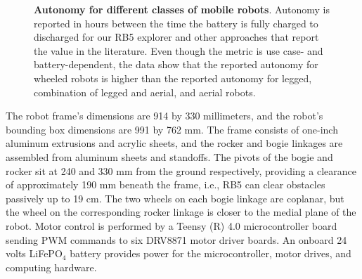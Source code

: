 \documentclass[letterpaper,10pt,conference,twoside]{IEEEtran}
\theoremstyle{definition}
\begin{document}
\begin{figure}[t]
  \vspace*{-.45cm}
  \begin{minipage}[t]{0.58\columnwidth}
    \hspace*{-.5cm}
    
  \end{minipage}\hfill
  \begin{minipage}[t]{0.41\columnwidth}
    \vspace*{-5.1cm}
    \centering
    \caption[Autonomy for different classes of mobile robots]{%
    \textbf{Autonomy for different classes of mobile robots}. 
    Autonomy is reported in hours between the time the battery is fully charged to discharged for our RB5 explorer and other approaches that report the value in the literature. Even though the metric is use case- and battery-dependent, the data show that the reported autonomy for wheeled robots is higher than the reported autonomy for legged, combination of legged and aerial, and aerial robots.
    }
    \label{fig}
  \end{minipage}
  \vspace*{-1cm}
\end{figure}

The robot frame's dimensions are 914 by 330 millimeters, and the robot's bounding box dimensions are 991 by 762 mm. The frame consists of one-inch aluminum extrusions and acrylic sheets, and the rocker and bogie linkages are assembled from aluminum sheets and standoffs. The pivots of the bogie and rocker sit at 240 and 330 mm from the ground respectively, providing a clearance of approximately 190 mm beneath the frame, i.e., RB5 can clear obstacles passively up to 19 cm. The two wheels on each bogie linkage are coplanar, but the wheel on the corresponding rocker linkage is closer to the medial plane of the robot. Motor control is performed by a Teensy (R) 4.0 microcontroller board sending PWM commands to six DRV8871 motor driver boards. An onboard 24 volts LiFePO${}_\text{4}$ battery provides power for the microcontroller, motor drives, and computing hardware.
\end{document}
